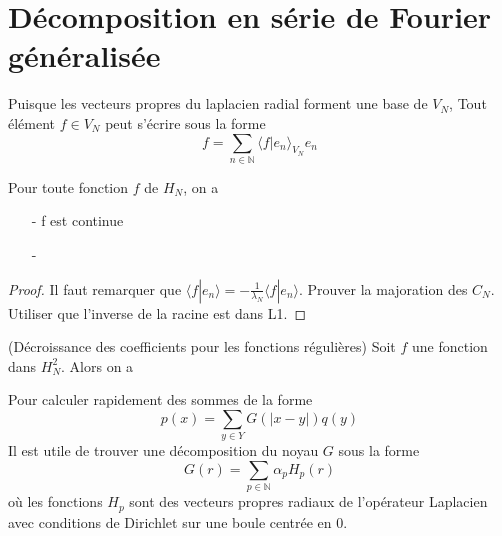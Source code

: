 \documentclass[11pt,a4paper]{article}
\begin{document}
\section{Décomposition en série de Fourier généralisée}

Puisque les vecteurs propres du laplacien radial forment une base de $V_N$, Tout élément $f\in V_N$ peut s'écrire sous la forme \[f = \sum_{n\in \mathbb{N}} \langle f| e_n\rangle_{V_N}e_n\]  

\begin{Prop}
Pour toute fonction $f$ de $H_N$, on a 
\begin{itemize}
\item[-] f est continue
\item[-] 


\end{itemize}

\begin{proof}
Il faut remarquer que $\langle f| e_n\rangle = -\frac{1}{\lambda_N} \langle f| e_n\rangle$. Prouver la majoration des $C_N$. Utiliser que l'inverse de la racine est dans L1. 
\end{proof}

\end{Prop}

\begin{Prop} (Décroissance des coefficients pour les fonctions régulières)
Soit $f$ une fonction dans $H^2_N$. Alors on a 

\end{Prop}


\pagebreak

Pour calculer rapidement des sommes de la forme \begin{equation}
p(x) = \sum_{y \in Y}G(|x-y|)q(y)
\end{equation}
Il est utile de trouver une décomposition du noyau $G$ sous la forme 
\begin{equation}
G(r) = \sum_{p \in \mathbb{N}}\alpha_p H_p(r)
\end{equation}
où les fonctions $H_p$ sont des vecteurs propres radiaux de l'opérateur Laplacien avec conditions de Dirichlet sur une boule centrée en 0. 
\end{document}
